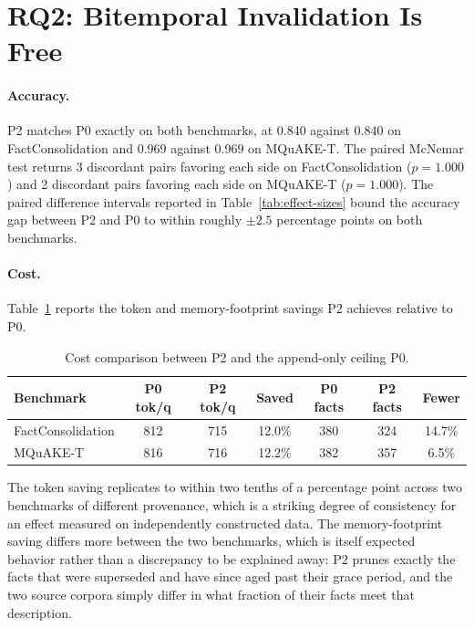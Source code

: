 \section{RQ2: Bitemporal Invalidation Is Free}
\label{sec:rq2}

\paragraph{Accuracy.} P2 matches P0 exactly on both benchmarks, at 0.840 against 0.840 on FactConsolidation and 0.969 against 0.969 on MQuAKE-T. The paired McNemar test returns 3 discordant pairs favoring each side on FactConsolidation ($p = 1.000$) and 2 discordant pairs favoring each side on MQuAKE-T ($p = 1.000$). The paired difference intervals reported in Table~\ref{tab:effect-sizes} bound the accuracy gap between P2 and P0 to within roughly $\pm 2.5$ percentage points on both benchmarks.

\paragraph{Cost.} Table~\ref{tab:cost-comparison} reports the token and memory-footprint savings P2 achieves relative to P0.

\begin{table}[H]
\centering
\caption{Cost comparison between P2 and the append-only ceiling P0.}
\label{tab:cost-comparison}
\begin{tabular}{lcccccc}
\toprule
Benchmark & P0 tok/q & P2 tok/q & Saved & P0 facts & P2 facts & Fewer \\
\midrule
FactConsolidation & 812 & 715 & 12.0\% & 380 & 324 & 14.7\% \\
MQuAKE-T & 816 & 716 & 12.2\% & 382 & 357 & 6.5\% \\
\bottomrule
\end{tabular}
\end{table}

The token saving replicates to within two tenths of a percentage point across two benchmarks of different provenance, which is a striking degree of consistency for an effect measured on independently constructed data. The memory-footprint saving differs more between the two benchmarks, which is itself expected behavior rather than a discrepancy to be explained away: P2 prunes exactly the facts that were superseded and have since aged past their grace period, and the two source corpora simply differ in what fraction of their facts meet that description.

